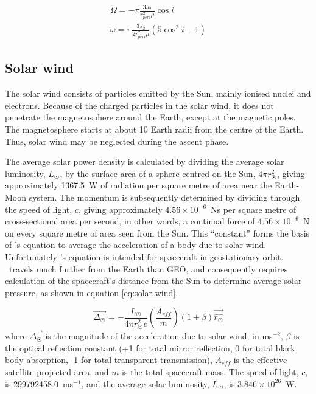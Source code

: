 \begin{subequations}\label{eq:Precession}
\begin{gather}
\dot\Omega = -\pi\frac{3J_2}{r_{peri}^2\mu}\cos i \\
\dot\omega = \pi\frac{3J_2}{2r_{peri}^2\mu}(5\cos^2i-1)
\end{gather}
\end{subequations}




\subsection{Solar wind} \label{sub:Solar-Wind}

The solar wind consists of particles emitted by the Sun, mainly ionised nuclei and electrons. Because of the charged particles in the solar wind, it does not penetrate the magnetosphere around the Earth, except at the magnetic poles. The magnetosphere starts at about 10 Earth radii from the centre of the Earth. Thus, solar wind may be neglected during the ascent phase.

The average solar power density is calculated by dividing the average solar luminosity, $L_\Sun$,  by the surface area of a sphere centred on the Sun, $4\pi r_\Sun^2$, giving approximately 1367.5~W of radiation per square metre of area near the Earth-Moon system. The momentum is subsequently determined by dividing through the speed of light, $c$, giving approximately $4.56\times10^{-6}$~Ns per square metre of cross-sectional area per second, in other words, a continual force of $4.56\times10^{-6}$~N on every square metre of area seen from the Sun. This \enquote{constant} forms the basis of \textcite[p. 223]{Chobotov2002}'s equation to average the acceleration of a body due to solar wind. Unfortunately \citeauthor{Chobotov2002}'s equation is intended for spacecraft in geostationary orbit. \BW\ travels much further from the Earth than GEO, and consequently requires calculation of the spacecraft's distance from the Sun to determine average solar pressure, as shown in equation \eqref{eq:solar-wind}.

\begin{equation}\label{eq:solar-wind}
\vec{\Delta_\Sun} = -\frac{L_\Sun}{4\pi r_\Sun^2c}\left(\frac{A_{eff}}{m}\right)(1+\beta)\vec{\hat{r_\Sun}}
\end{equation}
where $\vec{\Delta_\Sun}$ is the magnitude of the acceleration due to solar wind, in ms$^{-2}$, $\beta$ is the optical reflection constant (+1 for total mirror reflection, 0 for total black body absorption, -1 for total transparent transmission), $A_{eff}$ is the effective satellite projected area, and $m$ is the total spacecraft mass. The speed of light, $c$, is 299792458.0~ms$^{-1}$, and the average solar luminosity, $L_\Sun$, is $3.846\times10^{26}$~W.


